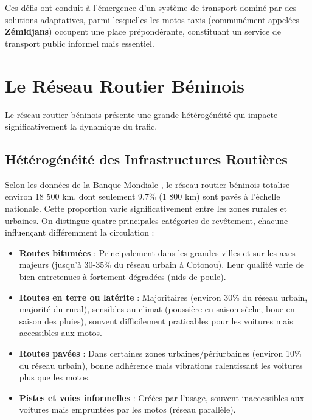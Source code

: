 Ces défis ont conduit à l'émergence d'un système de transport dominé par des solutions adaptatives, parmi lesquelles les motos-taxis (communément appelées \textbf{Zémidjans}) occupent une place prépondérante, constituant un service de transport public informel mais essentiel.

\section{Le Réseau Routier Béninois}
\label{sec:reseau_routier_beninois}

Le réseau routier béninois présente une grande hétérogénéité qui impacte significativement la dynamique du trafic.

\subsection{Hétérogénéité des Infrastructures Routières}
\label{subsec:heterogeneite_infra}

Selon les données de la Banque Mondiale \cite{worldbank2019benin}, le réseau routier béninois totalise environ 18 500 km, dont seulement 9,7\% (1 800 km) sont pavés à l'échelle nationale. Cette proportion varie significativement entre les zones rurales et urbaines. On distingue quatre principales catégories de revêtement, chacune influençant différemment la circulation :

\begin{itemize}
    \item \textbf{Routes bitumées} : Principalement dans les grandes villes et sur les axes majeurs (jusqu'à 30-35\% du réseau urbain à Cotonou). Leur qualité varie de bien entretenues à fortement dégradées (nids-de-poule).
    \item \textbf{Routes en terre ou latérite} : Majoritaires (environ 30\% du réseau urbain, majorité du rural), sensibles au climat (poussière en saison sèche, boue en saison des pluies), souvent difficilement praticables pour les voitures mais accessibles aux motos.
    \item \textbf{Routes pavées} : Dans certaines zones urbaines/périurbaines (environ 10\% du réseau urbain), bonne adhérence mais vibrations ralentissant les voitures plus que les motos.
    \item \textbf{Pistes et voies informelles} : Créées par l'usage, souvent inaccessibles aux voitures mais empruntées par les motos (réseau parallèle).
\end{itemize}

